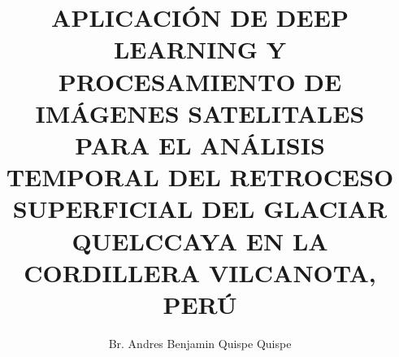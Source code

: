 




\pagestyle{plain}



\title{\MakeUppercase{Aplicación de Deep Learning y Procesamiento de Imágenes Satelitales para el Análisis Temporal del Retroceso Superficial del Glaciar Quelccaya en la Cordillera Vilcanota, Perú}}

\author{Br. Andres Benjamin Quispe Quispe}



	\maketitle
	\clearpage
	
	\tableofcontents %
	\clearpage
	\listoftables %
	\listoffigures %
	\setlength{\tabcolsep}{6pt} %
	\renewcommand{\arraystretch}{1}%
	\clearpage
	
	
	
	
	
	
	
	
	
	\printbibliography

	


